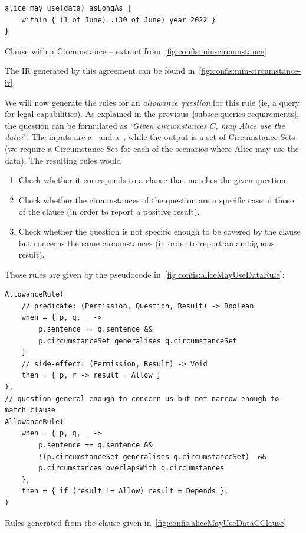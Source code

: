 \begin{listing}[h]
    \centering
    \begin{minipage}{0.7\textwidth}
        \begin{verbatim}
alice may use(data) asLongAs {
    within { (1 of June)..(30 of June) year 2022 }
}
        \end{verbatim}
    \end{minipage}
    \caption{Clause with a Circumstance -- extract from~\autoref{fig:confis:min-circumstance}}
    \label{fig:confis:aliceMayUseDataCClause}
\end{listing}

The IR generated by this agreement can be found in~\autoref{fig:confis:min-circumstance-ir}.

We will now generate the rules for an \emph{allowance question} for this rule (ie, a query for legal capabilities).
As explained in the previous~\autoref{subsec:queries-requirements}, the question can be formulated as \emph{`Given circumstances $C$, may Alice use the data?'}.
The inputs are a~ and a~, while the output is a set of Circumstance Sets (we require a Circumstance Set for each of the scenarios where Alice may use the data).
The resulting rules would
\begin{enumerate}
    \item Check whether it corresponds to a clause that matches the given question.
    \item Check whether the circumstances of the question are a specific case of those of the clause (in order to report a positive result).
    \item Check whether the question is not specific enough to be covered by the clause but concerns the same circumstances (in order to report an ambiguous result).
\end{enumerate}

Those rules are given by the pseudocode in~\autoref{fig:confis:aliceMayUseDataRule}:

\begin{listing}[h]
    \centering
    \begin{verbatim}
AllowanceRule(
    // predicate: (Permission, Question, Result) -> Boolean
    when = { p, q, _ ->
        p.sentence == q.sentence &&
        p.circumstanceSet generalises q.circumstanceSet
    }
    // side-effect: (Permission, Result) -> Void
    then = { p, r -> result = Allow }
),
// question general enough to concern us but not narrow enough to match clause
AllowanceRule(
    when = { p, q, _ ->
        p.sentence == q.sentence &&
        !(p.circumstanceSet generalises q.circumstanceSet)  &&
        p.circumstances overlapsWith q.circumstances
    },
    then = { if (result != Allow) result = Depends },
)
    \end{verbatim}
    \caption{Rules generated from the clause given in~\autoref{fig:confis:aliceMayUseDataCClause}}
    \label{fig:confis:aliceMayUseDataRule}
\end{listing}

